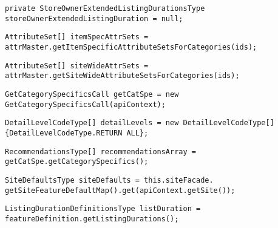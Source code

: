 \begin{lstlisting}[firstnumber=71, caption={Line 71 acceptable violation of the rule}]
private StoreOwnerExtendedListingDurationsType storeOwnerExtendedListingDuration = null;
\end{lstlisting}
\noindent\makebox[\linewidth]{\rule{\linewidth}{0.4pt}}
\begin{lstlisting}[firstnumber=93, caption={Line 93 acceptable violation of the rule}]
AttributeSet[] itemSpecAttrSets = attrMaster.getItemSpecificAttributeSetsForCategories(ids);
\end{lstlisting}
\noindent\makebox[\linewidth]{\rule{\linewidth}{0.4pt}}
\begin{lstlisting}[firstnumber=94, caption={Line 94 acceptable violation of the rule}]
AttributeSet[] siteWideAttrSets = attrMaster.getSiteWideAttributeSetsForCategories(ids);
\end{lstlisting}
\noindent\makebox[\linewidth]{\rule{\linewidth}{0.4pt}}
\begin{lstlisting}[firstnumber=100, caption={Line 100 acceptable violation of the rule}]
GetCategorySpecificsCall getCatSpe = new GetCategorySpecificsCall(apiContext);
\end{lstlisting}
\noindent\makebox[\linewidth]{\rule{\linewidth}{0.4pt}}
\begin{lstlisting}[firstnumber=102, caption={Line 102 acceptable violation of the rule}]
DetailLevelCodeType[] detailLevels = new DetailLevelCodeType[] {DetailLevelCodeType.RETURN ALL};
\end{lstlisting}
\noindent\makebox[\linewidth]{\rule{\linewidth}{0.4pt}}
\begin{lstlisting}[firstnumber=104, caption={Line 104 acceptable violation of the rule}]
RecommendationsType[] recommendationsArray = getCatSpe.getCategorySpecifics();
\end{lstlisting}
\noindent\makebox[\linewidth]{\rule{\linewidth}{0.4pt}}
\begin{lstlisting}[firstnumber=115, caption={Line 115acceptable violation of the rule}]
SiteDefaultsType siteDefaults = this.siteFacade. getSiteFeatureDefaultMap().get(apiContext.getSite());
\end{lstlisting}
\noindent\makebox[\linewidth]{\rule{\linewidth}{0.4pt}}
\begin{lstlisting}[firstnumber=130, caption={Line 130 acceptable violation of the rule}]
ListingDurationDefinitionsType listDuration = featureDefinition.getListingDurations();
\end{lstlisting}
\noindent\makebox[\linewidth]{\rule{\linewidth}{0.4pt}}
